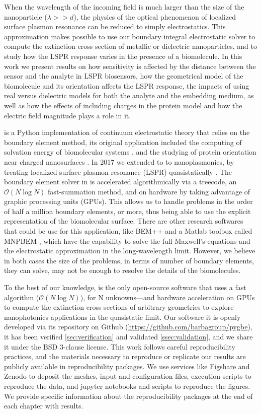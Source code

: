 When the wavelength of the incoming field is much larger than the size of the nanoparticle ($\lambda>>d$), the physics of the optical phenomenon of 
localized surface plasmon resonance can be reduced to simply electrostatics. This approximation makes possible to use our boundary integral 
electrostatic solver \pygbe to compute the extinction cross section of metallic or dielectric nanoparticles, and to study how the LSPR response varies in the 
presence of a biomolecule. In this work we present results on how sensitivity is affected by the distance between the sensor and the analyte in LSPR biosensors, 
how the geometrical model of the biomolecule and its orientation affects the LSPR response, the impacts of using real versus dielectric models for both 
the analyte and the embedding medium, as well as how the effects of including charges in the protein model and how the electric field magnitude
plays a role in it.

\pygbe is a Python implementation of continuum electrostatic theory that relies on the boundary element method, its original application included 
the computing of solvation energy of biomolecular systems \cite{CooperBardhanBarba2013}, and the studying of protein orientation near charged nanosurfaces \cite{CooperClementiBarba2015}. In 
2017 we extended \pygbe to to nanoplasmonics, by treating localized surface plasmon resonance (LSPR) quasistatically \cite{ClementiETal2017}. The boundary 
element solver in \pygbe is accelerated algorithmically via a treecode, an $\mathcal{O}(N\log N)$ fast-summation method, and on hardware by taking advantage of 
graphic processing units (GPUs). This allows us to handle problems in the order of half a million boundary elements, or more, thus being able to use the explicit 
representation of the biomolecular surface. There are other research softwares that could be use for this application, like BEM++ \cite{SmigajETal2015} and a Matlab toolbox 
called MNPBEM \cite{HohenesterTrugler2012}, which have the capability to solve the full Maxwell's equations and the electrostatic approximation in the long-wavelength limit. However, 
we believe in both cases the size of the problems, in terms of number of boundary elements, they can solve, may not be enough to resolve the details of the biomolecules. 
 
To the best of our knowledge, \pygbe is the only open-source software that uses a fast algorithm ($\mathcal{O}(N\log N)$),
for N unknowns—and hardware acceleration on GPUs to compute the extinction cross-sections of arbitrary geometries to explore
nanophotonics applications in the quasistatic limit. Our software it is openly developed via its repository on 
Github (\url{https://github.com/barbagroup/pygbe}), it has been verified \ref{sec:verification} and validated \ref{ssec:validation},
and we share it under the BSD 3-clause license.
This work follows careful reproducibility practices, and the materials necessary to reproduce or replicate our results are publicly available in 
reproducibility packages.  We use services like Figshare and Zenodo to deposit the meshes, input and configuration files, execution scripts 
to reproduce the data, and jupyter notebooks and scripts to reproduce the figures. We provide specific information about the reproducibility packages 
at the end of each chapter with results. 
